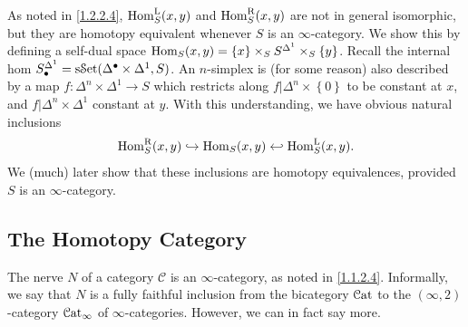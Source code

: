 As noted in \cref{1.2.2.4}, $\operatorname{Hom}_S^\mathrm{L} (x,y)$ and $\operatorname{Hom}_{S}^{\mathrm{R}}(x, y) $ are not in general isomorphic, but they are homotopy equivalent whenever $S$ is an $\infty $-category. We show this by defining a self-dual space $\operatorname{Hom}_S(x, y) =\left\{ x \right\}\times _S S^{\Delta ^1} \times _S\left\{ y \right\} $. Recall the internal hom $S^{\Delta ^1}_{\bullet}  =\mathrm{s}\mathcal{S}\mathrm{et} (\Delta^{\bullet} \times \Delta ^1,S)$. An $n$-simplex is (for some reason) also described by a map $f : \Delta ^n\times \Delta ^1 \to S$ which restricts along $f|\Delta ^n\times \left\{ 0 \right\} $ to be constant at $x$, and $f|\Delta ^n\times \Delta ^1$ constant at $y$. With this understanding, we have obvious natural inclusions
\[
	\operatorname{Hom}_{S}^{\mathrm{R}}(x, y) \hookrightarrow \operatorname{Hom}_S(x, y) \hookleftarrow \operatorname{Hom}_{S}^{\mathrm{L}}(x, y) 
.\]
We (much) later show that these inclusions are homotopy equivalences, provided $S$ is an $\infty $-category.

\subsection{The Homotopy Category}

The nerve $N$ of a category $\mathcal{C} $ is an $\infty $-category, as noted in \cref{1.1.2.4}. Informally, we say that $N$ is a fully faithful inclusion from the bicategory $\mathcal{C}\mathrm{at} $ to the $(\infty ,2)$-category $\mathcal{C}\mathrm{at}_{\infty} $ of $\infty $-categories. However, we can in fact say more.

